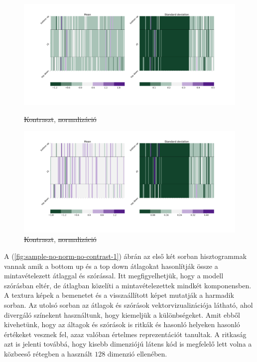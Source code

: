 \documentclass[12pt, english]{article}
\begin{document}
\begin{figure}[H]
  \begin{minipage}{0.5\linewidth}
    \centering
    \includegraphics[width=.75\linewidth]{z1_vis/14_DenseLinLinLadderVAE_noContrastNorm_-stats-1_vector_comparisons_1.png} 
    \caption{\st{Kontraszt}, \st{normalizáció}}
    \label{fig:sample-no-norm-no-contrast-1}
  \end{minipage}
  \begin{minipage}{0.5\linewidth}
    \centering
    \includegraphics[width=.75\linewidth]{z1_vis/14_DenseLinLinLadderVAE_noContrastNorm_-stats-2_vector_comparisons_1.png}
    \caption{\st{Kontraszt}, \st{normalizáció}}
    \label{fig:sample-no-norm-no-contrast-2}
  \end{minipage}
\end{figure}

\par A (\ref{fig:sample-no-norm-no-contrast-1}) ábrán az első két sorban hisztogrammak vannak amik a bottom up és a top down átlagokat hasonlítják össze a mintavételezett átlaggal és szórással. Itt megfigyelhetjük, hogy a modell szórásban eltér, de átlagban közelíti a mintavételezettek mindkét komponensben. A textura képek a bemenetet és a visszaállított képet mutatják a harmadik sorban. Az utolsó sorban az átlagok és szórások vektorvizualizációja látható, ahol divergáló színekent használtunk, hogy kiemeljük a különbségeket. Amit ebből kivehetünk, hogy az áltagok és szórások is ritkák és hasonló helyeken hasonló értékeket vesznek fel, azaz valóban értelmes reprezentációt tanultak. A ritkaság azt is jelenti továbbá, hogy kisebb dimenziójú látens kód is megfelelő lett volna a közbeeső rétegben a használt $128$ dimenzió ellenében.
\end{document}
